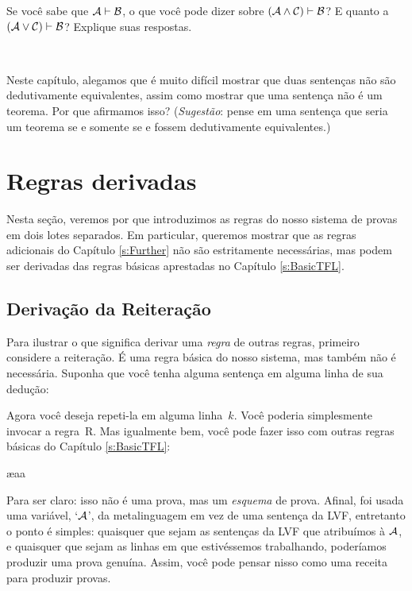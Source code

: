 \problempart
 Se voc\^e sabe que $\mathcal{A}\vdash\mathcal{B}$, o que voc\^e pode dizer sobre $(\mathcal{A}\wedge\mathcal{C})\vdash\mathcal{B}$? E quanto a $(\mathcal{A}\vee\mathcal{C})\vdash\mathcal{B}$? Explique suas respostas.

\

\problempart Neste cap\'itulo, alegamos que \'e muito dif\'icil mostrar que duas senten\c cas n\~ao s\~ao dedutivamente equivalentes, assim como mostrar que uma senten\c ca n\~ao \'e um teorema. Por que afirmamos isso? (\emph{Sugest\~ao}: pense em uma senten\c ca que seria um teorema se e somente se  e  fossem dedutivamente equivalentes.)


\chapter{Regras derivadas}\label{s:Derived}
Nesta se\c c\~ao, veremos por que introduzimos as regras do nosso sistema de provas em dois lotes separados. Em particular, queremos mostrar que as regras adicionais do Capítulo \ref{s:Further} n\~ao s\~ao estritamente necess\'arias, mas podem ser derivadas das regras b\'asicas aprestadas no Capítulo \ref{s:BasicTFL}. 

\section{Deriva\c c\~ao da Reitera\c c\~ao}
Para ilustrar o que significa derivar uma   \emph{regra} de outras regras, primeiro considere a reitera\c c\~ao. \'E uma regra b\'asica do nosso sistema, mas tamb\'em n\~ao \'e necess\'aria. Suponha que voc\^e tenha alguma senten\c ca em alguma linha de sua dedu\c c\~ao:
\begin{fitchproof}
\end{fitchproof}
Agora voc\^e deseja repeti-la em alguma linha~$k$. Voc\^e poderia simplesmente invocar a regra~R. Mas igualmente bem, voc\^e pode fazer isso com outras regras b\'asicas do Capítulo \ref{s:BasicTFL}:
\begin{fitchproof}
	\ae{aa}
\end{fitchproof}


Para ser claro: isso n\~ao \'e uma prova, mas um \emph{esquema} de prova. Afinal, foi usada  uma vari\'avel, `$\mathcal{A}$', da metalinguagem  em vez de uma senten\c ca da LVF, entretanto o ponto \'e simples: quaisquer que sejam as senten\c cas da LVF que atribu\'imos \`a $\mathcal{A}$, e quaisquer que sejam as linhas em que estiv\'essemos trabalhando, poder\'iamos produzir uma  prova genu\'ina. Assim, voc\^e pode pensar nisso como uma receita para produzir provas.

